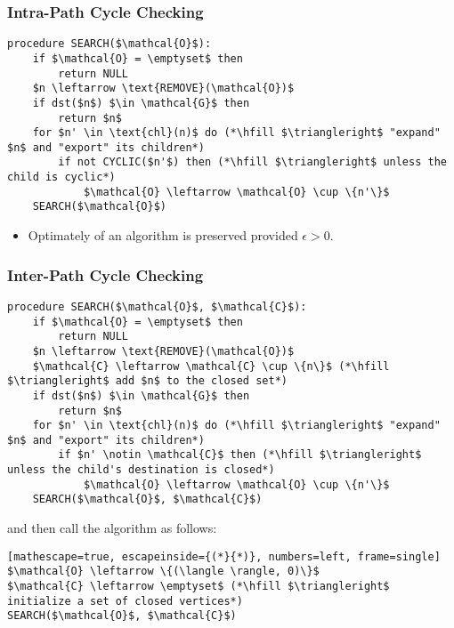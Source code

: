 \subsubsection{Intra-Path Cycle Checking}
\begin{definition}
\begin{lstlisting}
procedure SEARCH($\mathcal{O}$):
    if $\mathcal{O} = \emptyset$ then
        return NULL
    $n \leftarrow \text{REMOVE}(\mathcal{O})$
    if dst($n$) $\in \mathcal{G}$ then
        return $n$
    for $n' \in \text{chl}(n)$ do (*\hfill $\triangleright$ "expand" $n$ and "export" its children*)
        if not CYCLIC($n'$) then (*\hfill $\triangleright$ unless the child is cyclic*)
            $\mathcal{O} \leftarrow \mathcal{O} \cup \{n'\}$
    SEARCH($\mathcal{O}$)
\end{lstlisting}
\begin{itemize}
    \item Optimately of an algorithm is preserved provided $\epsilon>0$.
\end{itemize}

\end{definition}

\subsubsection{Inter-Path Cycle Checking}
\begin{definition}
\begin{lstlisting}
procedure SEARCH($\mathcal{O}$, $\mathcal{C}$):
    if $\mathcal{O} = \emptyset$ then
        return NULL
    $n \leftarrow \text{REMOVE}(\mathcal{O})$
    $\mathcal{C} \leftarrow \mathcal{C} \cup \{n\}$ (*\hfill $\triangleright$ add $n$ to the closed set*)
    if dst($n$) $\in \mathcal{G}$ then
        return $n$
    for $n' \in \text{chl}(n)$ do (*\hfill $\triangleright$ "expand" $n$ and "export" its children*)
        if $n' \notin \mathcal{C}$ then (*\hfill $\triangleright$ unless the child's destination is closed*)
            $\mathcal{O} \leftarrow \mathcal{O} \cup \{n'\}$
    SEARCH($\mathcal{O}$, $\mathcal{C}$)
\end{lstlisting}

and then call the algorithm as follows:

\begin{lstlisting}[mathescape=true, escapeinside={(*}{*)}, numbers=left, frame=single]
$\mathcal{O} \leftarrow \{(\langle \rangle, 0)\}$
$\mathcal{C} \leftarrow \emptyset$ (*\hfill $\triangleright$ initialize a set of closed vertices*)
SEARCH($\mathcal{O}$, $\mathcal{C}$)
\end{lstlisting}

\end{definition}
\newpage

